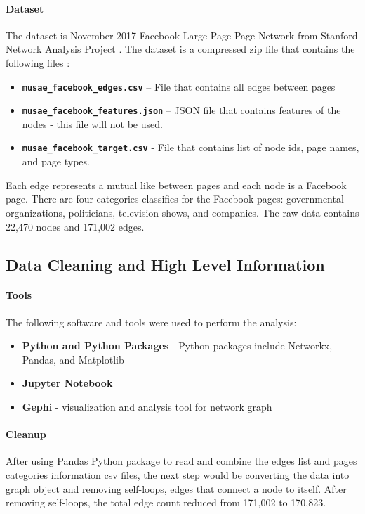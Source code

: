 \documentclass[11pt,twocolumn]{article}
\begin{document}
\paragraph{Dataset \cite{page-page-network-ds}}
The dataset is November 2017 Facebook Large Page-Page Network from Stanford Network Analysis Project \cite{page-page-network-ds}. The dataset is a compressed zip file that contains the following files :
\begin{itemize}
\item\textbf{\texttt{musae\_facebook\_edges.csv}} – File that contains all edges between pages
\item\textbf{\texttt{musae\_facebook\_features.json}} – JSON file that contains features of the nodes - this file will not be used.
\item\textbf{\texttt{musae\_facebook\_target.csv}} - File that contains list of node ids, page names, and page types.
\end{itemize}

Each edge represents a mutual like between pages and each node is a Facebook page. There are four categories classifies for the Facebook pages: governmental organizations, politicians, television shows, and companies. The raw data contains 22,470 nodes and 171,002 edges.

\subsection{Data Cleaning and High Level Information}

\paragraph{Tools}
The following software and tools were used to perform the analysis:
\begin{itemize}
\item \textbf{Python and Python Packages} - Python packages include Networkx, Pandas, and Matplotlib
\item \textbf{Jupyter Notebook}
\item \textbf{Gephi} - visualization and analysis tool for network graph
\end{itemize}

\paragraph{Cleanup}
After using Pandas Python package to read and combine the edges list and pages categories information csv files, the next step would be converting the data into graph object and removing self-loops, edges that connect a node to itself. After removing self-loops, the total edge count reduced from 171,002 to 170,823.
\end{document}
